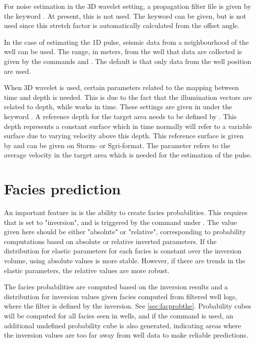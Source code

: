 For noise estimation in the 3D wavelet setting, a propagation filter file is given by the keyword . At present, this is not used. The keyword  can be given, but is not used since this stretch factor is automatically calculated from the offset angle.

In the case of estimating the 1D pulse, seismic data from a neighbourhood of the well can be used. The range, in meters, from the well that data are collected is given by the commands  and . The default is that only data from the well position are used. 

When 3D wavelet is used, certain parameters related to the mapping between time and depth is needed. This is due to the fact that the illumination vectors are related to depth, while \crava works in time. These settings are given in  under the keyword \newline {}. A reference depth for the target area needs to be defined by . This depth represents a constant surface which in time normally will refer to a variable surface due to varying velocity above this depth. This reference surface is given by  and can be given on Storm- or Sgri-format. The parameter  refers to the average velocity in the target area which is needed for the estimation of the pulse. 

\section{Facies prediction}
An important feature in \crava is the ability to create facies
probabilities. This requires that  is set to "inversion", and
is triggered by the  command under
. The value given here should be either
"absolute" or "relative", corresponding to probability computations
based on absolute or relative inverted parameters. If the distribution
for elastic parameters for each facies is constant over the inversion
volume, using absolute values is more stable. However, if there are
trends in the elastic parameters, the relative values are more
robust. 

The facies probabilities are computed based on the inversion results
and a distribution for inversion values given facies computed from
filtered well logs, where the filter is defined by the inversion. See
\autoref{sec:facprobthe}. Probability cubes will be computed for all
facies seen in wells, and if the command  is used,
an additional undefined probability cube is
also generated, indicating areas where the inversion values are too
far away from well data to make reliable predictions. 

